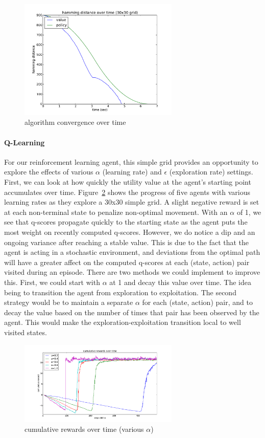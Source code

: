 \documentclass{sig-alternate}
\begin{document}
\begin{figure}[!htbp]
    \centering
    \includegraphics[width=3in]{images/simple/hd.pdf}
    \caption{algorithm convergence over time \label{simple-hd}}
\end{figure} 

\paragraph{Q-Learning}

For our reinforcement learning agent, this simple grid provides an opportunity to explore the effects of various $\alpha$ (learning rate) and $\epsilon$ (exploration rate) settings. First, we can look at how quickly the utility value at the agent's starting point accumulates over time. Figure~\ref{simple-q-alpha} shows the progress of five agents with various learning rates as they explore a 30x30 simple grid. A slight negative reward is set at each non-terminal state to penalize non-optimal movement. With an $\alpha$ of 1, we see that q-scores propagate quickly to the starting state as the agent puts the most weight on recently computed q-scores. However, we do notice a dip and an ongoing variance after reaching a stable value. This is due to the fact that the agent is acting in a stochastic environment, and deviations from the optimal path will have a greater affect on the computed q-scores at each (state, action) pair visited during an episode. There are two methods we could implement to improve this. First, we could start with $\alpha$ at 1 and decay this value over time. The idea being to transition the agent from exploration to exploitation. The second strategy would be to maintain a separate $\alpha$ for each (state, action) pair, and to decay the value based on the number of times that pair has been observed by the agent. This would make the exploration-exploitation transition local to well visited states.


\begin{figure}[!htbp]
    \centering
    \includegraphics[width=3in]{images/simple/q-alpha.pdf}
    \caption{cumulative rewards over time (various $\alpha$) \label{simple-q-alpha}}
\end{figure} 
\end{document}
